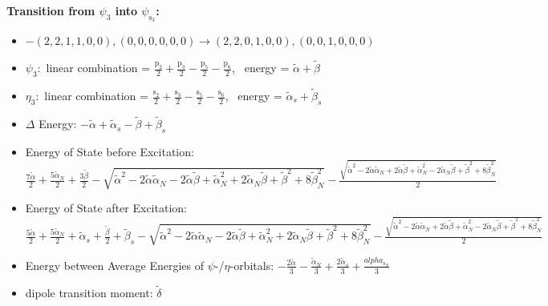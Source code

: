 \documentclass[12pt,a4paper]{article}
\begin{document}
        \noindent\textbf{Transition from $\psi_{3}$ into $\psi_{\text{s}_{3}}$:}
        \begin{itemize}
            \item $- (2, 2, 1, 1, 0, 0), (0, 0, 0, 0, 0, 0) \rightarrow (2, 2, 0, 1, 0, 0), (0, 0, 1, 0, 0, 0)$
        
            \item $\psi_{3}:$ linear combination = $\frac{\text{p}_{2}}{2} + \frac{\text{p}_{3}}{2} - \frac{\text{p}_{5}}{2} - \frac{\text{p}_{6}}{2}$, \
            energy = $\tilde{\alpha} + \tilde{\beta}$
            
            \item $\eta_{3}:$ linear combination = $\frac{\text{s}_{2}}{2} + \frac{\text{s}_{3}}{2} - \frac{\text{s}_{5}}{2} - \frac{\text{s}_{6}}{2}$, \
            energy = $\tilde{\alpha}_{s} + \tilde{\beta}_{s}$
            
                \item $\Delta$ Energy: $- \tilde{\alpha} + \tilde{\alpha}_{s} - \tilde{\beta} + \tilde{\beta}_{s}$
                \item Energy of State before Excitation: $\frac{7 \tilde{\alpha}}{2} + \frac{5 \tilde{\alpha}_{N}}{2} + \frac{3 \tilde{\beta}}{2} - \sqrt{\tilde{\alpha}^{2} - 2 \tilde{\alpha} \tilde{\alpha}_{N} - 2 \tilde{\alpha} \tilde{\beta} + \tilde{\alpha}_{N}^{2} + 2 \tilde{\alpha}_{N} \tilde{\beta} + \tilde{\beta}^{2} + 8 \tilde{\beta}_{N}^{2}} - \frac{\sqrt{\tilde{\alpha}^{2} - 2 \tilde{\alpha} \tilde{\alpha}_{N} + 2 \tilde{\alpha} \tilde{\beta} + \tilde{\alpha}_{N}^{2} - 2 \tilde{\alpha}_{N} \tilde{\beta} + \tilde{\beta}^{2} + 8 \tilde{\beta}_{N}^{2}}}{2}$
                \item Energy of State after Excitation: $\frac{5 \tilde{\alpha}}{2} + \frac{5 \tilde{\alpha}_{N}}{2} + \tilde{\alpha}_{s} + \frac{\tilde{\beta}}{2} + \tilde{\beta}_{s} - \sqrt{\tilde{\alpha}^{2} - 2 \tilde{\alpha} \tilde{\alpha}_{N} - 2 \tilde{\alpha} \tilde{\beta} + \tilde{\alpha}_{N}^{2} + 2 \tilde{\alpha}_{N} \tilde{\beta} + \tilde{\beta}^{2} + 8 \tilde{\beta}_{N}^{2}} - \frac{\sqrt{\tilde{\alpha}^{2} - 2 \tilde{\alpha} \tilde{\alpha}_{N} + 2 \tilde{\alpha} \tilde{\beta} + \tilde{\alpha}_{N}^{2} - 2 \tilde{\alpha}_{N} \tilde{\beta} + \tilde{\beta}^{2} + 8 \tilde{\beta}_{N}^{2}}}{2}$
                \item Energy between Average Energies of $\psi$-/$\eta$-orbitals: $- \frac{2 \tilde{\alpha}}{3} - \frac{\tilde{\alpha}_{N}}{3} + \frac{2 \tilde{\alpha}_{s}}{3} + \frac{alpha_{\text{s}_N}}{3}$
            
            \item dipole transition moment: $\tilde{\delta}$
        
        \end{itemize}
        
\end{document}
